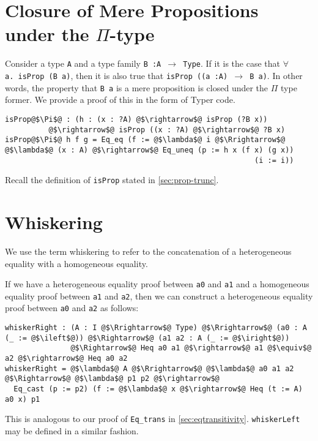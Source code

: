 \documentclass[12pt,twoside,maitrise]{dms}
\theoremstyle{definition}
\numberwithin{equation}{section}
\numberwithin{table}{chapter}
\numberwithin{figure}{chapter}
\newcommand\id[1] {\texttt{#1}}
\newcommand\fn[1] {\texttt{#1}}
\begin{document}
\section{Closure of Mere Propositions under the $\Pi$-type}\label{app:closure-mp-pi}

Consider a type \id{A} and a type family \fn{B :\@ A $\rightarrow$ Type}. If it
is the case that \fn{$\forall$ a.\ isProp (B a)}, then it is also true that
\fn{isProp ((a :\@ A) $\rightarrow$ B a)}. In other words, the property that
\fn{B a} is a mere proposition is closed under the $\Pi$ type former. We
provide a proof of this in the form of Typer code.

\begin{verbatim}
isProp@$\Pi$@ : (h : (x : ?A) @$\rightarrow$@ isProp (?B x))
          @$\rightarrow$@ isProp ((x : ?A) @$\rightarrow$@ ?B x)
isProp@$\Pi$@ h f g = Eq_eq (f := @$\lambda$@ i @$\Rrightarrow$@ @$\lambda$@ (x : A) @$\rightarrow$@ Eq_uneq (p := h x (f x) (g x))
                                                         (i := i))
\end{verbatim}

Recall the definition of \id{isProp} stated in \autoref{sec:prop-trunc}.

\section{Whiskering}\label{app:whiskering}

We use the term whiskering to refer to the concatenation of a heterogeneous
equality with a homogeneous equality.

If we have a heterogeneous equality proof between \id{a0} and \id{a1} and a
homogeneous equality proof between \id{a1} and \id{a2}, then we can construct a
heterogeneous equality proof between \id{a0} and \id{a2} as follows:

\begin{verbatim}
whiskerRight : (A : I @$\Rrightarrow$@ Type) @$\Rrightarrow$@ (a0 : A (_ := @$\ileft$@)) @$\Rightarrow$@ (a1 a2 : A (_ := @$\iright$@))
               @$\Rightarrow$@ Heq a0 a1 @$\rightarrow$@ a1 @$\equiv$@ a2 @$\rightarrow$@ Heq a0 a2
whiskerRight = @$\lambda$@ A @$\Rrightarrow$@ @$\lambda$@ a0 a1 a2 @$\Rightarrow$@ @$\lambda$@ p1 p2 @$\rightarrow$@
  Eq_cast (p := p2) (f := @$\lambda$@ x @$\rightarrow$@ Heq (t := A) a0 x) p1
\end{verbatim}


This is analogous to our proof of \id{Eq\_trans} in
\autoref{sec:eqtransitivity}. \id{whiskerLeft} may be defined in a similar
fashion.
\end{document}
